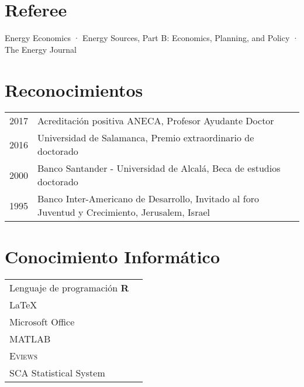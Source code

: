 \documentclass[11pt]{article}\usepackage[]{graphicx}\usepackage[]{color}
\begin{document}
\section{Referee} 
\raggedright

Energy Economics · Energy Sources, Part B: Economics, Planning, and Policy · The Energy Journal

\section{Reconocimientos} 

\begin{tabular}{lp{}}

\vspace{5pt} 2017 & Acreditación positiva ANECA, Profesor Ayudante Doctor\\

\vspace{5pt} 2016 & Universidad de Salamanca, Premio extraordinario de doctorado\\

\vspace{5pt} 2000 & Banco Santander - Universidad de Alcalá, Beca de estudios doctorado\\

\vspace{5pt} 1995 & Banco Inter-Americano de Desarrollo, Invitado al foro Juventud y Crecimiento, Jerusalem, Israel

\end{tabular}

\section{Conocimiento Informático} 

\begin{tabular}{ll}

Lenguaje de programación \textbf{\textsf{R}}\\
{\LaTeX}\\
Microsoft Office\\
\textsc{MATLAB}\\
\textsc{Eviews}\\
SCA Statistical System\\

\end{tabular}
\end{document}
